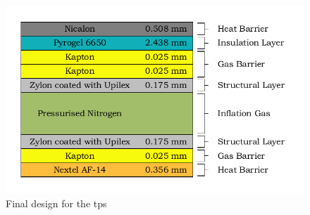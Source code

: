 \begin{figure}[h]
	\centering
	\includegraphics{./Figure/Thermal/finallayup.pdf}
	\caption{Final design for the \acrlong{tps}}
	\label{fig:finallayup}
\end{figure}
